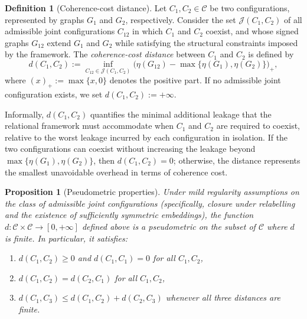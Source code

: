 \documentclass[11pt,a4paper]{article}
\newtheorem{proposition}[theorem]{Proposition}
\theoremstyle{definition}
\newtheorem{definition}[theorem]{Definition}
\newcommand{\Cconf}{\mathcal{C}} %
\begin{document}
\begin{definition}[Coherence-cost distance]
Let \(C_1, C_2 \in \Cconf\) be two configurations, represented by graphs \(G_1\) and \(G_2\), respectively. Consider the set \(\mathcal{J}(C_1,C_2)\) of all admissible joint configurations \(C_{12}\) in which \(C_1\) and \(C_2\) coexist, and whose signed graphs \(G_{12}\) extend \(G_1\) and \(G_2\) while satisfying the structural constraints imposed by the framework. The \emph{coherence-cost distance} between \(C_1\) and \(C_2\) is defined by
\[
 d(C_1,C_2) := \inf_{C_{12} \in \mathcal{J}(C_1,C_2)} \bigl( \eta(G_{12}) - \max\{\eta(G_1), \eta(G_2)\} \bigr)_+,
\]
where \((x)_+ := \max\{x,0\}\) denotes the positive part. If no admissible joint configuration exists, we set \(d(C_1,C_2) := +\infty\).
\end{definition}

Informally, \(d(C_1,C_2)\) quantifies the minimal additional leakage that the relational framework must accommodate when \(C_1\) and \(C_2\) are required to coexist, relative to the worst leakage incurred by each configuration in isolation. If the two configurations can coexist without increasing the leakage beyond \(\max\{\eta(G_1),\eta(G_2)\}\), then \(d(C_1,C_2) = 0\); otherwise, the distance represents the smallest unavoidable overhead in terms of coherence cost.

\begin{proposition}[Pseudometric properties]
Under mild regularity assumptions on the class of admissible joint configurations (specifically, closure under relabelling and the existence of sufficiently symmetric embeddings), the function \(d : \Cconf \times \Cconf \to [0,+\infty]\) defined above is a pseudometric on the subset of \(\Cconf\) where \(d\) is finite. In particular, it satisfies:
\begin{enumerate}[label=(\roman*)]
\item \(d(C_1,C_2) \geq 0\) and \(d(C_1,C_1) = 0\) for all \(C_1, C_2\),
\item \(d(C_1,C_2) = d(C_2,C_1)\) for all \(C_1, C_2\),
\item \(d(C_1,C_3) \leq d(C_1,C_2) + d(C_2,C_3)\) whenever all three distances are finite.
\end{enumerate}
\end{proposition}
\end{document}
